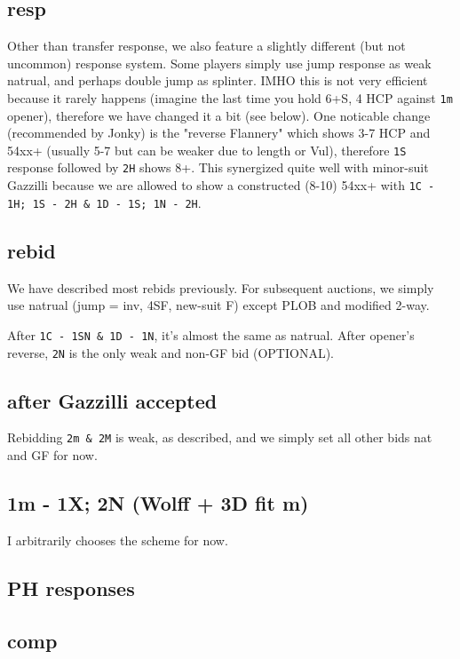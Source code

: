 \subsection{resp}

Other than transfer response, we also feature a slightly different (but not uncommon) response system.
Some players simply use jump response as weak natrual, and perhaps double jump as splinter.
IMHO this is not very efficient because it rarely happens (imagine the last time you hold 6+S, 4 HCP against \texttt{1m} opener),
therefore we have changed it a bit (see below).
One noticable change (recommended by Jonky) is the "reverse Flannery" which shows 3-7 HCP and 54xx+ (usually 5-7 but can be weaker due to length or Vul), therefore \texttt{1S} response followed by \texttt{2H} shows 8+.
This synergized quite well with minor-suit Gazzilli because we are allowed to show a constructed (8-10) 54xx+ with \texttt{1C - 1H; 1S - 2H \& 1D - 1S; 1N - 2H}.


\subsection{rebid}

We have described most rebids previously. For subsequent auctions, we simply use natrual (jump = inv, 4SF, new-suit F) except PLOB and modified 2-way.


After \texttt{1C - 1SN \& 1D - 1N}, it's almost the same as natrual. After opener's reverse, \texttt{2N} is the only weak and non-GF bid (OPTIONAL).


\subsection{after Gazzilli accepted}

Rebidding \texttt{2m \& 2M} is weak, as described, and we simply set all other bids nat and GF for now.


\subsection{1m - 1X; 2N (Wolff + 3D fit m)}

I arbitrarily chooses the scheme for now.


\subsection{PH responses}


\subsection{comp}


